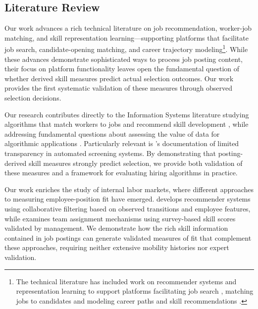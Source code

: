 \subsection{Literature Review}

Our work advances a rich technical literature on job recommendation, worker-job matching, and skill 
representation learning---supporting platforms that facilitate job search, candidate-opening matching, and 
career trajectory modeling\footnote{The technical literature has included work on recommender systems 
\citep{shaha2012survey,siting2012job} and representation learning \citep{heap2014combining, zhu2018person, 
liu2019tripartite, bian2020learning} to support platforms facilitating job search 
\citep{heap2014combining,giabelli2021skills2job}, matching jobs to candidates \citep{zhu2018person,qin2020enhanced} 
and modeling career paths and skill recommendations \citep{maurya2017bayesian, kokkodis2021demand}.}. While these 
advances demonstrate sophisticated ways to process job posting content, their focus on platform functionality leaves 
open the fundamental question of whether derived skill measures predict actual selection outcomes. Our work provides 
the first systematic validation of these measures through observed selection decisions.

Our research contributes directly to the Information Systems literature studying algorithms that match workers to 
jobs and recommend skill development \citep{kokkodis2021demand, kokkodis2023good}, while addressing fundamental 
questions about assessing the value of data for algorithmic applications \citep{lei2024value}. Particularly relevant 
is \citet{raghavan2020mitigating}'s documentation of limited transparency in automated screening systems. By 
demonstrating that posting-derived skill measures strongly predict selection, we provide both validation of these 
measures and a framework for evaluating hiring algorithms in practice.

Our work enriches the study of internal labor markets, where different approaches to measuring employee-position 
fit have emerged. \citet{devos2024data} develops recommender systems using collaborative filtering based on observed 
transitions and employee features, while \citet{2024_Cowgill} examines team assignment mechanisms using survey-based 
skill scores validated by management. We demonstrate how the rich skill information contained in job postings can 
generate validated measures of fit that complement these approaches, requiring neither extensive mobility histories 
nor expert validation.

